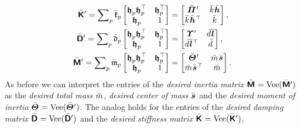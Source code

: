 \begin{subequations}\label{eq:CtrlMDK}
\begin{align}
 \bodyStiffMatCp{}{} = \sumParticles \particleStiffnessC{\PidxI} \begin{bmatrix} \particleBodyPos{\PidxI} \particleBodyPos{\PidxI}^\top & \particleBodyPos{\PidxI}^\top \\ \particleBodyPos{\PidxI} & 1 \end{bmatrix} 
 &= \begin{bmatrix} \bodyMOSCp{}{}{} & \bodyStiffnessC{}{}\bodyCOSC{}{} \\ \bodyStiffnessC{}{}\bodyCOSC{}{}^\top & \bodyStiffnessC{}{} \end{bmatrix},
\\
 \bodyDissMatCp{}{} = \sumParticles \particleDampingC{\PidxI} \begin{bmatrix} \particleBodyPos{\PidxI} \particleBodyPos{\PidxI}^\top & \particleBodyPos{\PidxI}^\top \\ \particleBodyPos{\PidxI} & 1 \end{bmatrix} 
 &= \begin{bmatrix} \bodyMODp{}{}{} & \bodyDampingC{}{}\bodyCODC{}{} \\ \bodyDampingC{}{}\bodyCODC{}{}^\top & \bodyDampingC{}{} \end{bmatrix},
\\
 \bodyInertiaMatCp{}{} = \sumParticles \particleMassC{\PidxI} \begin{bmatrix} \particleBodyPos{\PidxI} \particleBodyPos{\PidxI}^\top & \particleBodyPos{\PidxI}^\top \\ \particleBodyPos{\PidxI} & 1 \end{bmatrix} 
 &= \begin{bmatrix} \bodyMOICp{}{} & \bodyMassC{}{}\bodyCOMC{}{} \\ \bodyMassC{}{}\bodyCOMC{}{}^\top & \bodyMassC{}{} \end{bmatrix}.
\end{align}
\end{subequations}
As before we can interpret the entries of the \textit{desired inertia matrix} $\bodyInertiaMatC{}{} = \veeMatOp(\bodyInertiaMatCp{}{})$ as the \textit{desired total mass} $\bodyMassC{}{}$, \textit{desired center of mass} $\bodyCOMC{}{}$ and the \textit{desired moment of inertia} $\bodyMOIC{}{} = \veeMatOp(\bodyMOICp{}{})$.
The analog holds for the entries of the \textit{desired damping matrix} $\bodyDissMatC{}{} = \veeMatOp(\bodyDissMatCp{}{})$ and the \textit{desired stiffness matrix} $\bodyStiffMatC{}{} = \veeMatOp(\bodyStiffMatCp{}{})$.

